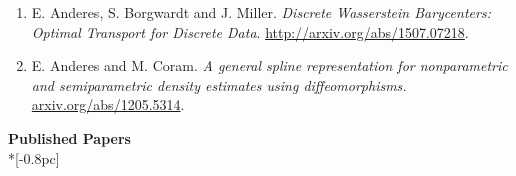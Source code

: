 \documentclass[11pt]{article}
\newcommand{\head}[1]{
  \vspace{10pt}
  {\Large \bf #1} \\*[-0.8pc]
  \underline{\hspace{6.07in}}}
\begin{document}
\vspace{.1mm}


\begin{enumerate}[labelindent=0pt]


\item
E. Anderes, S. Borgwardt and J. Miller. \textsl{Discrete Wasserstein Barycenters: Optimal Transport for Discrete Data}.
\url{http://arxiv.org/abs/1507.07218}.



\item
E. Anderes and M. Coram.  \textsl{A general spline representation for nonparametric and semiparametric density estimates using diffeomorphisms.}  \url{arxiv.org/abs/1205.5314}.

\end{enumerate}



\newpage


\head{Published Papers}%

 \vspace{.1mm}
\end{document}
